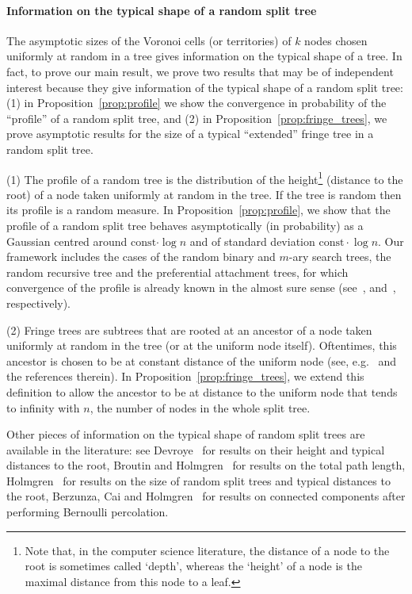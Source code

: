 \documentclass[10pt]{amsart}
\theoremstyle{definition}\newtheorem{defi}[theo]{Definition}\newtheorem{rema}[theo]{Remark}\newtheorem{exam}[theo]{Example}\newtheorem{exem}[theo]{Example}\newtheorem{nota}[theo]{Notation}
\newcommand{\const}{\mathrm{const}}
\begin{document}
\paragraph*{Information on the typical shape of a random split tree}
The asymptotic sizes of the Voronoi cells (or territories) of $k$ nodes chosen uniformly at random in a tree gives information on the typical shape of a tree. In fact, to prove our main result, we prove two results that may be of independent interest because they give information of the typical shape of a random split tree: (1) in Proposition~\ref{prop:profile} we show the convergence in probability of the ``profile'' of a random split tree, and (2) in Proposition~\ref{prop:fringe_trees}, we prove asymptotic results for the size of a typical ``extended'' fringe tree in a random split tree.

(1) The profile of a random tree is the distribution of the height\footnote{Note that, in the computer science literature, the distance of a node to the root is sometimes called `depth', whereas the `height' of a node is the maximal distance from this node to a leaf.} (distance to the root) of a node taken uniformly at random in the tree. If the tree is random then its profile is a random measure. In Proposition~\ref{prop:profile}, we show that the profile of a random split tree behaves asymptotically (in probability) as a Gaussian centred around $\const{\cdot{\log n}}$ and of standard deviation $\const\cdot{\log n}$. Our framework includes the cases of the random binary and $m$-ary search trees, the random recursive tree and the preferential attachment trees, for which convergence of the profile is already known in the almost sure sense (see~\cite{CDJ01,MM17}, and~\cite{Katona05}, respectively).

(2) Fringe trees are subtrees that are rooted at an ancestor of a node taken uniformly at random in the tree (or at the uniform node itself). Oftentimes, this ancestor is chosen to be at constant distance of the uniform node (see, e.g.~\cite{JansonHolm} and the references therein). In Proposition~\ref{prop:fringe_trees}, we extend this definition to allow the ancestor to be at distance to the uniform node that tends to infinity with $n$, the number of nodes in the whole split tree.

Other pieces of information on the typical shape of random split trees are available in the literature: see Devroye~\cite{devroye-split} for results on their height and typical distances to the root, Broutin and Holmgren~\cite{BH12} for results on the total path length, Holmgren~\cite{Holmgren12} for results on the size of random split trees and typical distances to the root, Berzunza, Cai and Holmgren~\cite{BCH19, berzunza2021asymptotic} for results on connected components after performing Bernoulli percolation.
\end{document}
